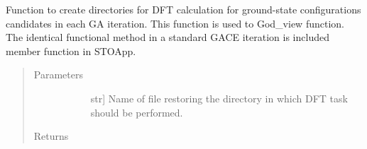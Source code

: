 \documentclass[letterpaper,10pt,english]{sphinxmanual}
\begin{document}
\begin{fulllineitems}
\begin{quote}
\begin{description}
\begin{description}
\end{description}

\end{description}\end{quote}

\begin{fulllineitems}
\label{\detokenize{pygace.examples.sto:pygace.examples.sto.sto_gace.STOApp.DEFAULT_SETUP}}
\end{fulllineitems}


\begin{fulllineitems}
\label{\detokenize{pygace.examples.sto:pygace.examples.sto.sto_gace.STOApp.create_dir_for_DFT}}
Function to create directories for DFT calculation for ground-state
configurations candidates in each GA iteration. This function is used
to God\_view function. The identical functional method in a standard
GACE iteration is included  member function in STOApp.
\begin{quote}\begin{description}
\item[{Parameters}] \leavevmode\begin{description}
\item[{}] \leavevmode{[}str{]}
Name of file restoring the directory in which DFT task should be
performed.

\end{description}

\item[{Returns}] \leavevmode\begin{description}
\item[{}] \leavevmode
\end{description}

\end{description}\end{quote}


\end{fulllineitems}
\end{fulllineitems}
\end{document}
